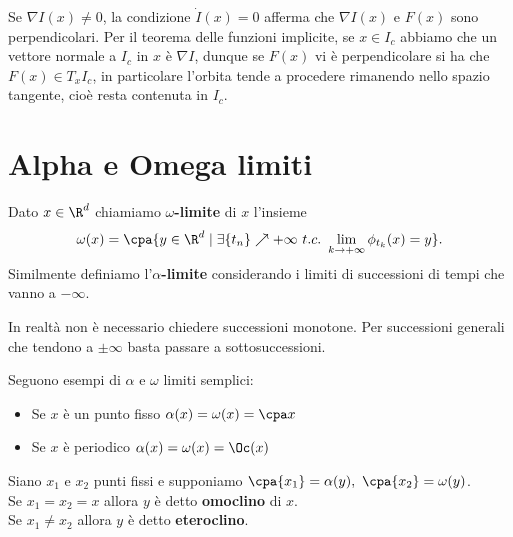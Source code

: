 \begin{remark}
Se $\nabla I(x)\neq 0$, la condizione $\dot I(x)=0$ afferma che $\nabla I(x)$ e $F(x)$ sono perpendicolari. Per il teorema delle funzioni implicite, se $x\in I_c$ abbiamo che un vettore normale a $I_c$ in $x$ \`e $\nabla I$, dunque se $F(x)$ vi \`e perpendicolare si ha che $F(x)\in T_x I_c$, in particolare l'orbita tende a procedere rimanendo nello spazio tangente, cio\`e resta contenuta in $I_c$.
\end{remark}

\section{Alpha e Omega limiti}
\begin{definition}
Dato $x\in\R^d$ chiamiamo \textbf{$\omega$-limite} di $x$ l'insieme
\[\omega(x)=\cpa{y\in\R^d\mid \exists \{t_n\}\nearrow +\infty\ t.c.\ \lim_{k\to+\infty}\phi_{t_k}(x)=y}.\]
Similmente definiamo l'\textbf{$\alpha$-limite} considerando i limiti di successioni di tempi che vanno a $-\infty$.
\end{definition}
\begin{remark}
In realt\`a non \`e necessario chiedere successioni monotone. Per successioni generali che tendono a $\pm\infty$ basta passare a sottosuccessioni.
\end{remark}

\begin{example}
Seguono esempi di $\alpha$ e $\omega$ limiti semplici:
\begin{itemize}
\item Se $x$ \`e un punto fisso $\alpha(x)=\omega(x)=\cpa x$
\item Se $x$ \`e periodico $\alpha(x)=\omega(x)=\Oc(x)$
\end{itemize}
\end{example}

\begin{definition}
Siano $x_1$ e $x_2$ punti fissi e supponiamo $\cpa{x_1}=\alpha(y),\ \cpa{x_2}=\omega(y)$.\\ 
Se $x_1=x_2=x$ allora $y$ \`e detto \textbf{omoclino} di $x$.\\
Se $x_1\neq x_2$ allora $y$ \`e detto \textbf{eteroclino}.
\end{definition}

